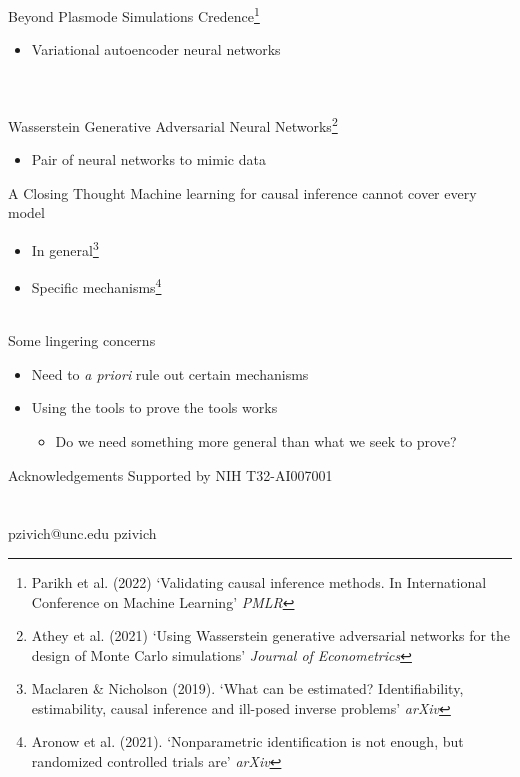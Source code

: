 \documentclass{beamer}
\begin{document}
\begin{frame}{Beyond Plasmode Simulations}
	Credence\footnote[frame]{Parikh et al. (2022) `Validating causal inference methods. In International Conference on Machine Learning' \textit{PMLR}}
	\begin{itemize}
		\item Variational autoencoder neural networks
	\end{itemize}~\\~\\
	Wasserstein Generative Adversarial Neural Networks\footnote[frame]{Athey et al. (2021) `Using Wasserstein generative adversarial networks for the design of Monte Carlo simulations' \textit{Journal of Econometrics}}
	\begin{itemize}
		\item Pair of neural networks to mimic data
	\end{itemize}
\end{frame}

\begin{frame}{A Closing Thought}
	Machine learning for causal inference cannot cover every model
	\begin{itemize}
		\item In general\footnote[frame]{Maclaren \& Nicholson (2019). `What can be estimated? Identifiability, estimability, causal inference and ill-posed inverse problems' \textit{arXiv}}
		\item Specific mechanisms\footnote[frame]{Aronow et al. (2021). `Nonparametric identification is not enough, but randomized controlled trials are' \textit{arXiv}}
	\end{itemize}~\\
	Some lingering concerns
	\begin{itemize}
		\item Need to \textit{a priori} rule out certain mechanisms
		\item Using the tools to prove the tools works
		\begin{itemize}
			\item Do we need something more general than what we seek to prove?
		\end{itemize}
	\end{itemize}
\end{frame}

\begin{frame}{Acknowledgements}
	Supported by NIH T32-AI007001\\~\\~\\
	
	\centering
	\faEnvelope \quad pzivich@unc.edu \qquad
	\faGithub \quad pzivich\\
\end{frame}
\end{document}
